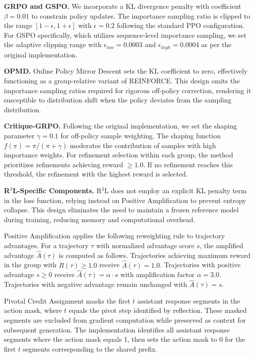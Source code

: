 \textbf{GRPO and GSPO.} We incorporate a KL divergence penalty with coefficient $\beta = 0.01$ to constrain policy updates. The importance sampling ratio is clipped to the range $[1-\epsilon, 1+\epsilon]$ with $\epsilon=0.2$ following the standard PPO configuration. For GSPO specifically, which utilizes sequence-level importance sampling, we set the adaptive clipping range with $\epsilon_{low}=0.0003$ and $\epsilon_{high}=0.0004$ as per the original implementation.

\textbf{OPMD.} Online Policy Mirror Descent sets the KL coefficient to zero, effectively functioning as a group-relative variant of REINFORCE. This design omits the importance sampling ratios required for rigorous off-policy correction, rendering it susceptible to distribution shift when the policy deviates from the sampling distribution.

\textbf{Critique-GRPO.} Following the original implementation, we set the shaping parameter $\gamma=0.1$ for off-policy sample weighting. The shaping function $f(\pi) = \pi / (\pi + \gamma)$ moderates the contribution of samples with high importance weights. For refinement selection within each group, the method prioritizes refinements achieving reward $\geq 1.0$. If no refinement reaches this threshold, the refinement with the highest reward is selected.

\textbf{R$^3$L-Specific Components.} R$^3$L does not employ an explicit KL penalty term in the loss function, relying instead on Positive Amplification to prevent entropy collapse. This design eliminates the need to maintain a frozen reference model during training, reducing memory and computational overhead.

Positive Amplification applies the following reweighting rule to trajectory advantages. For a trajectory $\tau$ with normalized advantage score $s$, the amplified advantage $\hat{A}(\tau)$ is computed as follows. Trajectories achieving maximum reward in the group with $R(\tau) \geq 1.0$ receive $\hat{A}(\tau) = 1.0$. Trajectories with positive advantage $s \geq 0$ receive $\hat{A}(\tau) = \alpha \cdot s$ with amplification factor $\alpha = 3.0$. Trajectories with negative advantage remain unchanged with $\hat{A}(\tau) = s$.

Pivotal Credit Assignment masks the first $t$ assistant response segments in the action mask, where $t$ equals the pivot step identified by reflection. These masked segments are excluded from gradient computation while preserved as context for subsequent generation. The implementation identifies all assistant response segments where the action mask equals 1, then sets the action mask to 0 for the first $t$ segments corresponding to the shared prefix.

